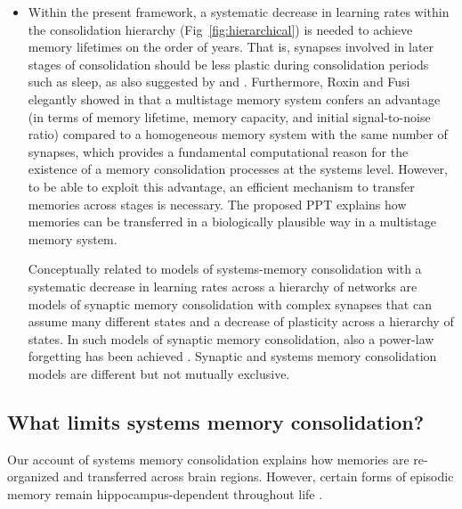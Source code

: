 \begin{itemize}
\item[(4)] Within the present framework, a systematic decrease in learning rates within the consolidation hierarchy (Fig~\ref{fig:hierarchical}) is needed to achieve memory lifetimes on the order of years. That is, synapses involved in later stages of consolidation should be less plastic during consolidation periods such as sleep, as also suggested by \cite{Roxin2013} and \cite{Tome2020}.
Furthermore, Roxin and Fusi elegantly showed in \cite{Roxin2013} that a multistage memory system confers an advantage (in terms of memory lifetime, memory capacity, and initial signal-to-noise ratio) compared to a homogeneous memory system with the same number of synapses, which provides a fundamental computational reason for the existence of a memory consolidation processes at the systems level. However, to be able to exploit this advantage, an efficient mechanism to transfer memories across stages is necessary. The proposed PPT explains how memories can be transferred in a biologically plausible way in a multistage memory system.



Conceptually related to models of systems-memory consolidation with a systematic decrease in learning rates across a hierarchy of networks are models of synaptic memory consolidation with complex synapses that can assume many different states and a decrease of plasticity across a hierarchy of states. In such models of synaptic memory consolidation, also a power-law forgetting has been achieved \cite{Fusi2005, Benna2016}.
Synaptic and systems memory consolidation models are different but not mutually exclusive.

\end{itemize}

\subsection{What limits systems memory consolidation?}
Our account of systems memory consolidation explains how memories are re-organized and transferred across brain regions.
However, certain forms of episodic memory remain hippocampus-dependent throughout life \cite{Winocur2011}.

